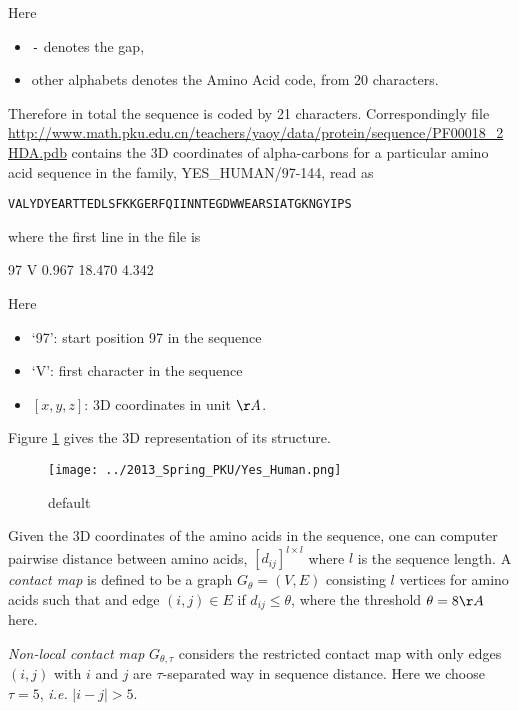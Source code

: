 \documentclass[11pt]{article}
\begin{document}
\noindent Here 
\begin{itemize}
\item {\tt{-}} denotes the gap,
\item other alphabets denotes the Amino Acid code, from 20 characters. 
\end{itemize} 
Therefore in total the sequence is coded by 21 characters. Correspondingly file \url{http://www.math.pku.edu.cn/teachers/yaoy/data/protein/sequence/PF00018\_2HDA.pdb} contains the 3D coordinates of alpha-carbons for a particular amino acid sequence in the family, YES\_HUMAN/97-144, read as

{\tt{VALYDYEARTTEDLSFKKGERFQIINNTEGDWWEARSIATGKNGYIPS}}

\noindent where the first line in the file is 

97	V	0.967	18.470	4.342

\noindent Here
\begin{itemize}
\item `97': start position 97 in the sequence
\item `V': first character in the sequence
\item $[x,y,z]$: 3D coordinates in unit $\AA$.
\end{itemize}

\noindent Figure \ref{yes_human} gives the 3D representation of its structure. 

\begin{figure}[htbp]
\begin{center}
\texttt{[image: ../2013\_Spring\_PKU/Yes\_Human.png]}  
\caption{default}
\label{yes_human}
\end{center}
\end{figure}

Given the 3D coordinates of the amino acids in the sequence, one can computer pairwise distance between amino acids, $[d_{ij}]^{l\times l}$ where $l$ is the sequence length. A \emph{contact map} is defined to be a graph $G_\theta=(V,E)$ consisting $l$ vertices for amino acids such that and edge $(i,j)\in E$ if $d_{ij} \leq \theta$, where the threshold $\theta=8\AA$ here. 

\emph{Non-local contact map} $G_{\theta,\tau}$ considers the restricted contact map with only edges $(i,j)$ with $i$ and $j$ are $\tau$-separated way in sequence distance. Here we choose $\tau=5$, \emph{i.e.} $|i-j|> 5$. 

\end{document}
